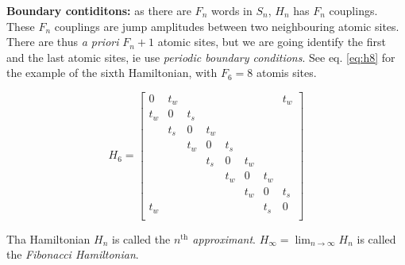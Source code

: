 \documentclass[11pt]{article}
\begin{document}
\textbf{Boundary contiditons:} as there are $F_n$ words in $S_n$, $H_n$ has $F_n$ couplings. These $F_n$ couplings are jump amplitudes between two neighbouring atomic sites. There are thus \textit{a priori} $F_n + 1$ atomic sites, but we are going identify the first and the last atomic sites, ie use \textit{periodic boundary conditions}.
See eq. \eqref{eq:h8} for the example of the sixth Hamiltonian, with $F_6 = 8$ atomis sites.

\begin{equation}
\label{eq:h8} 
	H_6 = 
	\begin{bmatrix}
	0 & t_w &   &   &   &   &   & t_w\\
	t_w & 0 & t_s &   &   &   &   &  \\
	  & t_s & 0 & t_w &   &   &   &  \\
	  &   & t_w & 0 & t_s &   &   &  \\
	  &   &   & t_s & 0 & t_w &   &  \\
	  &   &   &   & t_w & 0 & t_w &  \\
	  &   &   &   &   & t_w & 0 & t_s\\
	t_w &   &   &   &   &   & t_s & 0\\
\end{bmatrix}
\end{equation}

Tha Hamiltonian $H_n$ is called the \textit{$n^\text{th}$ approximant}. $H_\infty = \lim_{n \rightarrow \infty} H_n$ is called the \textit{Fibonacci Hamiltonian}.
\end{document}

